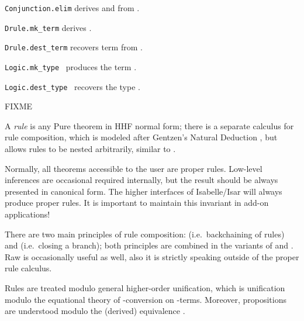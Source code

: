 \begin{isabellebody}
\begin{isamarkuptext}
\begin{description}
  \item \verb|Conjunction.elim| derives  and 
  from .

  \item \verb|Drule.mk_term| derives .

  \item \verb|Drule.dest_term| recovers term  from .

  \item \verb|Logic.mk_type|~\isa{{\isasymtau}} produces the term .

  \item \verb|Logic.dest_type|~ recovers the type
  \isa{{\isasymtau}}.

  \end{description}%
\end{isamarkuptext}%
\isamarkuptrue%
%
\endisatagmlref
{\isafoldmlref}%
%
\isadelimmlref
%
\endisadelimmlref
%
\isamarkuptrue%
%
\isadelimFIXME
%
\endisadelimFIXME
%
\isatagFIXME
%
\begin{isamarkuptext}%
FIXME

  A \emph{rule} is any Pure theorem in HHF normal form; there is a
  separate calculus for rule composition, which is modeled after
  Gentzen's Natural Deduction \cite{Gentzen:1935}, but allows
  rules to be nested arbitrarily, similar to \cite{extensions91}.

  Normally, all theorems accessible to the user are proper rules.
  Low-level inferences are occasional required internally, but the
  result should be always presented in canonical form.  The higher
  interfaces of Isabelle/Isar will always produce proper rules.  It is
  important to maintain this invariant in add-on applications!

  There are two main principles of rule composition:  (i.e.\ backchaining of rules) and  (i.e.\ closing a branch); both principles are
  combined in the variants of  and .  Raw  is occasionally
  useful as well, also it is strictly speaking outside of the proper
  rule calculus.

  Rules are treated modulo general higher-order unification, which is
  unification modulo the equational theory of \isa{{\isasymalpha}{\isasymbeta}{\isasymeta}}-conversion
  on \isa{{\isasymlambda}}-terms.  Moreover, propositions are understood modulo
  the (derived) equivalence .


\end{isamarkuptext}
\end{isabellebody}

